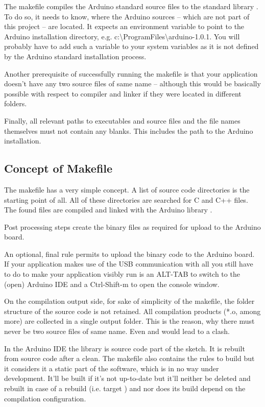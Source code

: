 The makefile compiles the Arduino standard source files to the standard
library . To do so, it needs to know, where the Arduino sources
-- which are not part of this project -- are located. It expects an
environment variable  to point to the Arduino
installation directory, e.g.
c:\textbackslash{}ProgramFiles\textbackslash\-arduino-1.0.1. You will
probably have to add such a variable to your system variables as it is not
defined by the Arduino standard installation process.

Another prerequisite of successfully running the makefile is that your
application doesn't have any two source files of same name -- although
this would be basically possible with respect to compiler and linker if
they were located in different folders.

Finally, all relevant paths to executables and source files and the file
names themselves must not contain any blanks. This includes the path to
the Arduino installation.

\subsection{Concept of Makefile}

The makefile has a very simple concept. A list of source code directories
is the starting point of all. All of these directories are searched for C
and C++ files. The found files are compiled and linked with the Arduino
library .

Post processing steps create the binary files as required for upload to
the Arduino board.

An optional, final rule permits to upload the binary code to the Arduino
board. If your application makes use of the USB communication with
 all you still have to do to make your application visibly
run is an ALT-TAB to switch to the (open) Arduino IDE and a Ctrl-Shift-m
to open the console window.

On the compilation output side, for sake of simplicity of the makefile,
the folder structure of the source code is not retained. All compilation
products (*.o, among more) are collected in a single output folder. This
is the reason, why there must never be two source files of same name. Even
 and  would lead to a clash.

In the Arduino IDE the library  is source code part of the
sketch. It is rebuilt from source code after a clean. The \rtos{} makefile
also contains the rules to build  but it considers it a
static part of the software, which is in no way under development. It'll
be built if it's not up-to-date but it'll neither be deleted and rebuilt
in case of a rebuild (i.e. target ) and nor does its build
depend on the compilation configuration.

